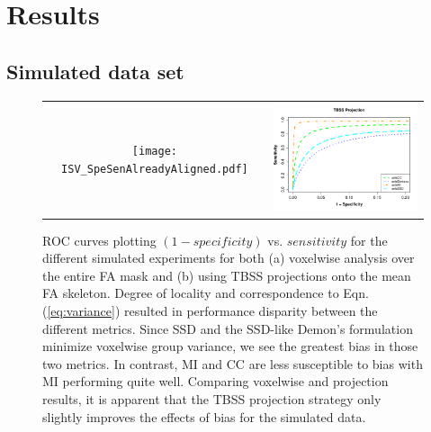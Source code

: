 \documentclass[final,5p,times,twocolumn]{elsarticle}
\begin{document}
\section{Results}

\subsection{Simulated data set} 


\begin{figure}
\begin{center}
\begin{tabular}{cc}
  \texttt{[image: ISV\_SpeSenAlreadyAligned.pdf]} &
  \includegraphics[width=86mm]{ISV_SpeSen_projectionAlreadyAligned.pdf}
\end{tabular}
\caption{ROC curves plotting $(1 - specificity)$ vs. $sensitivity$ for the
different simulated experiments for both (a) voxelwise analysis over the
entire FA mask and (b) using TBSS projections onto the mean FA skeleton.
Degree of locality and correspondence to 
Eqn. (\ref{eq:variance}) resulted in performance disparity between the
different metrics.  Since SSD and the SSD-like Demon's formulation 
minimize voxelwise group variance, we see the greatest bias in those 
two metrics.  In contrast, MI and CC are less susceptible to bias with
MI performing quite well.  Comparing voxelwise and projection results, 
it is apparent that the TBSS projection strategy only slightly improves 
the effects of bias for the simulated data.
}
\label{fig:simulated_plots}
\end{center}        
\end{figure}
\end{document}
